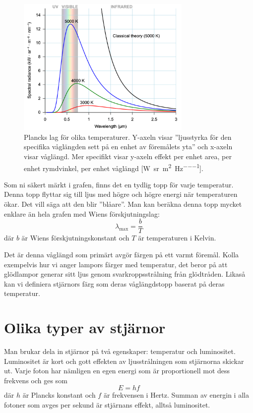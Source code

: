 \begin{figure}[h!]
    \centering
    \includegraphics[width=0.75\textwidth]{img/Black_body.png}
    \caption{Plancks lag för olika temperaturer. Y-axeln visar ''ljusstyrka för den specifika våglängden sett på en enhet av föremålets yta'' och x-axeln visar våglängd. Mer specifikt visar y-axeln effekt per enhet area, per enhet rymdvinkel, per enhet våglängd [\unit[per-mode=power]{\watt\per\steradian\per\meter\squared\per\hertz}].}
    \label{fig:planck-distribution}
\end{figure}

Som ni säkert märkt i grafen, finns det en tydlig topp för varje temperatur. Denna topp flyttar sig till ljus med högre och högre energi när temperaturen ökar. Det vill säga att den blir ''blåare''. Man kan beräkna denna topp mycket enklare än hela grafen med Wiens förskjutningslag:
\begin{equation}
    \lambda_\text{max} = \frac{b}{T}
    \label{eq:wien-displacement}
\end{equation}
där $b$ är Wiens förskjutningskonstant och $T$ är temperaturen i Kelvin.

Det är denna våglängd som primärt avgör färgen på ett varmt föremål. Kolla exempelvis hur vi anger lampors färger med temperatur, det beror på att glödlampor generar sitt ljus genom svarkroppsstrålning från glödtråden. Likaså kan vi definiera stjärnors färg som deras våglängdstopp baserat på deras temperatur.

\section{Olika typer av stjärnor}
Man brukar dela in stjärnor på två egenskaper: temperatur och luminositet. Luminositet är kort och gott effekten av ljusstrålningen som stjärnorna skickar ut. Varje foton har nämligen en egen energi som är proportionell mot dess frekvens och ges som
\begin{equation}
    E = hf
    \label{eq:photon-energy}
\end{equation}
där $h$ är Plancks konstant och $f$ är frekvensen i Hertz. Summan av energin i alla fotoner som avges per sekund är stjärnans effekt, alltså luminositet.

